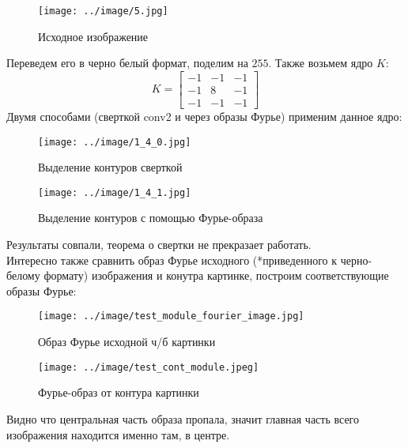 \begin{figure}[!htb]
    \centering
    \texttt{[image: ../image/5.jpg]}   
    \caption{Исходное изображение}
\end{figure}

\noindent Переведем его в черно белый формат, поделим на $255$. Также возьмем ядро $K$:
$$
K = \begin{bmatrix}
    -1 & -1 & -1\\
    -1 & 8 & -1\\
    -1 & -1 & -1
\end{bmatrix}
$$
Двумя способами (сверткой conv2  и через образы Фурье) применим данное ядро:
\begin{figure}[!htb]
    \texttt{[image: ../image/1\_4\_0.jpg]}
    \caption{Выделение контуров сверткой} 
    \endminipage\hfill
    \texttt{[image: ../image/1\_4\_1.jpg]}   
    \caption{Выделение контуров с помощью Фурье-образа}
    \endminipage\hfill
\end{figure}

\noindent  Результаты совпали, теорема о свертки не прекразает работать.
\\ \noindent Интересно также сравнить образ Фурье исходного (*приведенного к черно-белому формату) изображения и конутра картинке, построим соответствующие образы Фурье:

\begin{figure}[!htb]
    \texttt{[image: ../image/test\_module\_fourier\_image.jpg]}
    \caption{Образ Фурье исходной ч/б картинки} 
    \endminipage\hfill
    \texttt{[image: ../image/test\_cont\_module.jpeg]}   
    \caption{Фурье-образ от контура картинки}
    \endminipage\hfill
\end{figure}

\noindent Видно что центральная часть образа пропала, значит главная часть всего изображения находится именно там, в центре.

